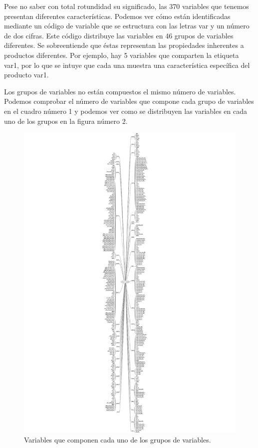 \documentclass[11pt,a4paper,spanish]{article} %
\begin{document}
\vspace{0.5cm}

Pese no saber con total rotundidad su significado, las 370 variables que tenemos presentan diferentes características. Podemos ver cómo están identificadas mediante un código de variable que se estructura con las letras var y un número de dos cifras. Este código distribuye las variables en 46 grupos de variables diferentes. Se sobreentiende que éstas representan las propiedades inherentes a productos diferentes. Por ejemplo, hay 5 variables que comparten la etiqueta var1, por lo que se intuye que cada una muestra una característica específica del producto var1. 

\vspace{0.5cm}

Los grupos de variables no están compuestos el mismo número de variables. Podemos comprobar el número de variables que compone cada grupo de variables en el cuadro número 1 y podemos ver como se distribuyen las variables en cada uno de los grupos en la figura número 2.

\newpage

\begin{figure}[h!]
	\begin{center}
	\includegraphics[width=6.3in, height=\textheight,keepaspectratio]{Z_01_02_Numero_variable.pdf}
	\caption{Variables que componen cada uno de los grupos de variables.}
    \end{center}
\end{figure}
\end{document}
